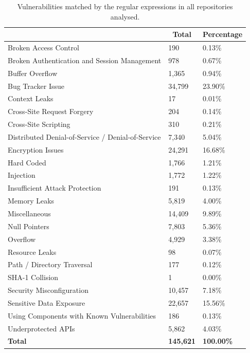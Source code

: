 \documentclass[12pt, a4paper]{report}
\begin{document}
\begin{table}[H]
  \centering
  \begin{tabular}{|l|l|l|}
    \hline
    \rowcolor[HTML]{D8D8D8}
    \multicolumn{1}{|c|}{Vulnerabilities} & \multicolumn{1}{|c|}{Total} &
    \multicolumn{1}{|c|}{Percentage} \\ \hline
    Broken Access Control & 190 & 0.13\% \\
    Broken Authentication and Session Management & 978 & 0.67\% \\
    Buffer Overflow & 1,365 & 0.94\% \\
    Bug Tracker Issue & 34,799 & 23.90\% \\
    Context Leaks & 17 & 0.01\% \\
    Cross-Site Request Forgery & 204 & 0.14\% \\
    Cross-Site Scripting & 310 & 0.21\% \\
    Distributed Denial-of-Service / Denial-of-Service & 7,340 & 5.04\% \\
    Encryption Issues & 24,291 & 16.68\% \\
    Hard Coded & 1,766 & 1.21\% \\
    Injection & 1,772 & 1.22\% \\
    Insufficient Attack Protection & 191 & 0.13\% \\
    Memory Leaks & 5,819 & 4.00\% \\
    Miscellaneous & 14,409 & 9.89\% \\
    Null Pointers & 7,803 & 5.36\% \\
    Overflow & 4,929 & 3.38\% \\
    Resource Leaks & 98 & 0.07\% \\
    Path / Directory Traversal & 177 & 0.12\% \\
    SHA-1 Collision & 1 & 0.00\% \\
    Security Misconfiguration & 10,457 & 7.18\% \\
    Sensitive Data Exposure & 22,657 & 15.56\% \\
    Using Components with Known Vulnerabilities & 186 & 0.13\% \\
    Underprotected APIs & 5,862 & 4.03\% \\ \hline \hline
    \textbf{Total} & \textbf{145,621} & \textbf{100.00\%} \\ \hline
  \end{tabular}
  \caption{Vulnerabilities matched by the regular expressions in all repositories analysed.}
\end{table}
\end{document}
